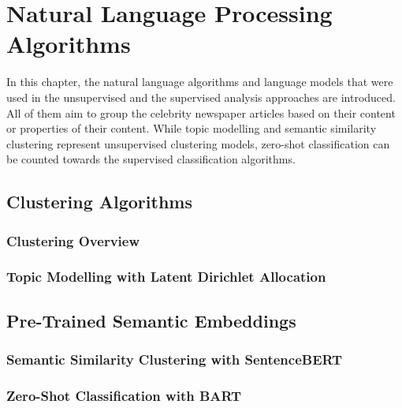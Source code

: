 \renewcommand{\imagepath}{../30-algorithms/img}

\chapter{Natural Language Processing Algorithms}
In this chapter, the natural language algorithms and language models that were used in the unsupervised and the supervised analysis approaches are introduced. All of them aim to group the celebrity newspaper articles based on their content or properties of their content. While topic modelling and semantic similarity clustering represent unsupervised clustering models, zero-shot classification can be counted towards the supervised classification algorithms.

\section{Clustering Algorithms}
\subsection*{Clustering Overview}
\subsection*{Topic Modelling with Latent Dirichlet Allocation}\label{ch:lda}

\section{Pre-Trained Semantic Embeddings}
\subsection*{Semantic Similarity Clustering with SentenceBERT}\label{ch:sentencebert}
\subsection*{Zero-Shot Classification with BART}